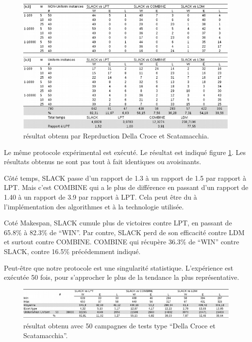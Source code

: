 \documentclass[a4paper,12pt]{report}
\theoremstyle{plain}				%
\theoremstyle{definition}				%
\begin{document}
\begin{figure}
{\centering
\includegraphics[width=\columnwidth]{3_Resultat_Reproduction_De_DCS.png}
\caption{résultat obtenu par Reprduction Della Croce et Scatamacchia.}
\label{fig:resultatReproductionDellaCroceScatamacchia}
\par}
\end{figure}

Le même protocole expérimental est exécuté. Le résultat est indiqué 
  figure \ref{fig:resultatReproductionDellaCroceScatamacchia}. 
Les résultats obtenus ne sont pas tout à fait identiques ou avoisinants. 
  
Côté temps, SLACK passe d'un rapport de 1.3 à un rapport de 1.5 par rapport à LPT. 
Mais c'est COMBINE qui a le plus de différence en passant d'un rapport de 1.40 
  à un rapport de 3.9 par rapport à LPT. 
Cela peut être du à l'implémentation des algorithmes et à la technologie utilisée. 

Coté Makespan, SLACK cumule plus de victoires contre LPT, en passant de 65.8\% à 82.3\% de ``WIN''.
Par contre, SLACK perd de son efficacité contre LDM et surtout contre COMBINE. COMBINE qui récupère 36.3\% de ``WIN'' contre SLACK, contre 16.5\% précédemment indiqué.

Peut-être que notre protocole est une singularité statistique. L'expérience est exécutée 50 fois, pour s'approcher le plus de la tendance la plus représentative.


\begin{figure}
{\centering
\includegraphics[width=\columnwidth]{4_Resultat_Reproduction50DCS.png}
\caption{résultat obtenu avec 50 campagnes de tests type ``Della Croce et Scatamacchia''.}
\label{fig:resultatReproduction50DellaCroceScatamacchia}
\par}
\end{figure}
\end{document}

